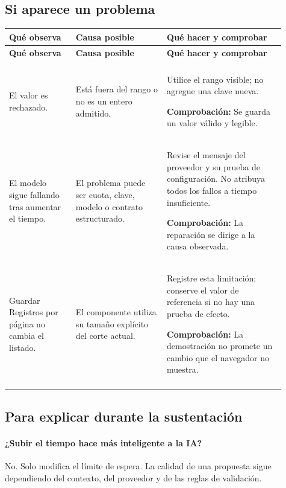 \subsection{Si aparece un problema}
\begingroup
\fontsize{10}{12.5}\selectfont
\setlength{\tabcolsep}{5pt}
\renewcommand{\arraystretch}{1.15}
\begin{longtable}{@{}>{\RaggedRight\arraybackslash}p{0.22\linewidth}>{\RaggedRight\arraybackslash}p{0.3\linewidth}>{\RaggedRight\arraybackslash}p{0.39\linewidth}@{}}
\toprule
\textbf{Qué observa} & \textbf{Causa posible} & \textbf{Qué hacer y comprobar} \\
\midrule
\endfirsthead
\toprule
\textbf{Qué observa} & \textbf{Causa posible} & \textbf{Qué hacer y comprobar} \\
\midrule
\endhead
\midrule
\multicolumn{3}{r}{\footnotesize Continúa en la página siguiente}\\
\endfoot
\bottomrule
\endlastfoot
El valor es rechazado. & Está fuera del rango o no es un entero admitido. & Utilice el rango visible; no agregue una clave nueva.\par\smallskip\textbf{Comprobación:} Se guarda un valor válido y legible. \\
\addlinespace[3pt]
El modelo sigue fallando tras aumentar el tiempo. & El problema puede ser cuota, clave, modelo o contrato estructurado. & Revise el mensaje del proveedor y su prueba de configuración. No atribuya todos los fallos a tiempo insuficiente.\par\smallskip\textbf{Comprobación:} La reparación se dirige a la causa observada. \\
\addlinespace[3pt]
Guardar Registros por página no cambia el listado. & El componente utiliza su tamaño explícito del corte actual. & Registre esta limitación; conserve el valor de referencia si no hay una prueba de efecto.\par\smallskip\textbf{Comprobación:} La demostración no promete un cambio que el navegador no muestra. \\
\addlinespace[3pt]
\end{longtable}
\endgroup

\subsection{Para explicar durante la sustentación}
\paragraph{¿Subir el tiempo hace más inteligente a la IA?} No. Solo modifica el límite de espera. La calidad de una propuesta sigue dependiendo del contexto, del proveedor y de las reglas de validación.

